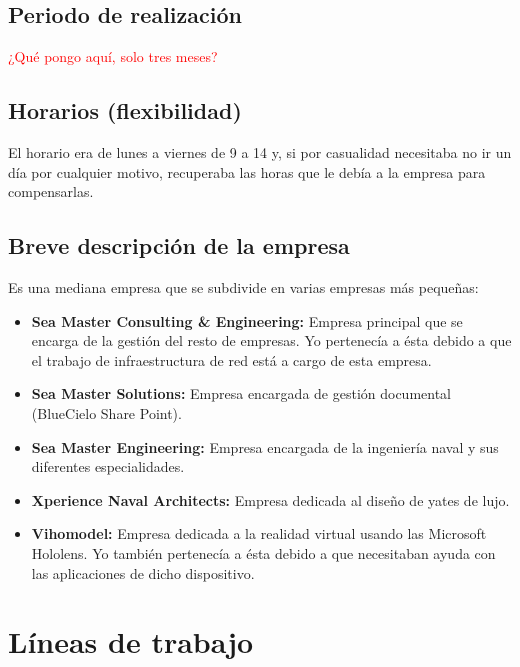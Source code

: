 \documentclass[12pt,letterpaper]{article}
\begin{document}
\subsection{Periodo de realización}
\textcolor{red}{¿Qué pongo aquí, solo tres meses?}

\subsection{Horarios (flexibilidad)}
El horario era de lunes a viernes de 9 a 14 y, si por casualidad necesitaba no ir un día por cualquier motivo, recuperaba las horas que le debía a la empresa para compensarlas.

\subsection{Breve descripción de la empresa}
Es una mediana empresa que se subdivide en varias empresas más pequeñas:
\begin{itemize}
	\item \textbf{Sea Master Consulting \& Engineering:} Empresa principal que se encarga de la gestión del resto de empresas. Yo pertenecía a ésta debido a que el trabajo de infraestructura de red está a cargo de esta empresa.
	\item \textbf{Sea Master Solutions:} Empresa encargada de gestión documental (BlueCielo Share Point).
	\item \textbf{Sea Master Engineering:} Empresa encargada de la ingeniería naval y sus diferentes especialidades.
	\item \textbf{Xperience Naval Architects:} Empresa dedicada al diseño de yates de lujo.
	\item \textbf{Vihomodel:} Empresa dedicada a la realidad virtual usando las Microsoft Hololens. Yo también pertenecía a ésta debido a que necesitaban ayuda con las aplicaciones de dicho dispositivo.
\end{itemize}


\section{Líneas de trabajo}
\end{document}
